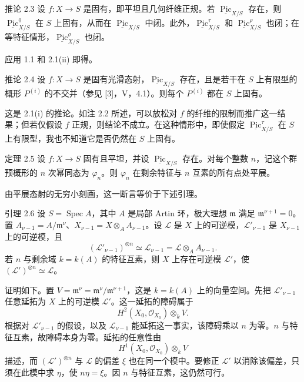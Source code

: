 \begin{statement}{推论 2.3}
设 $f\colon X\to S$ 是固有，即平坦且几何纤维正规。若 $\underline{\operatorname{Pic}}_{X/S}$ 存在，则 $\underline{\operatorname{Pic}}^0_{X/S}$ 在 $S$ 上固有，从而在 $\underline{\operatorname{Pic}}_{X/S}$ 中闭。此外，$\underline{\operatorname{Pic}}^\tau_{X/S}$ 和 $\underline{\operatorname{Pic}}^\rho_{X/S}$ 也闭；在等特征情形，$\underline{\operatorname{Pic}}^\sigma_{X/S}$ 也闭。
\end{statement}
应用 1.1 和 2.1(ii) 即得。

\begin{statement}{推论 2.4}
设 $f\colon X\to S$ 是固有光滑态射，$\underline{\operatorname{Pic}}_{X/S}$ 存在，且是若干在 $S$ 上有限型的概形 $P^{(i)}$ 的不交并（参见 [3]，V，4.1）。则每个 $P^{(i)}$ 都在 $S$ 上固有。
\end{statement}
这是 2.1(i) 的推论。如注 2.2 所述，可以放松对 $f$ 的纤维的限制而推广这一结果；但若仅假设 $f$ 正规，则结论不成立。在这种情形中，即使假定 $\underline{\operatorname{Pic}}^\tau_{X/S}$ 在 $S$ 上有限型，我也不知道它是否仍然在 $S$ 上固有。

\begin{statement}{定理 2.5}
设 $f\colon X\to S$ 固有且平坦，并设 $\underline{\operatorname{Pic}}_{X/S}$ 存在。对每个整数 $n$，记这个群预概形的 $n$ 次幂同态为 $\varphi_n$。则 $\varphi_n$ 在剩余特征与 $n$ 互素的所有点处平展。
\end{statement}
由平展态射的无穷小刻画，这一断言等价于下述引理。

\begin{statement}{引理 2.6}
设 $S=\operatorname{Spec}A$，其中 $A$ 是局部 Artin 环，极大理想 $\mathfrak m$ 满足 $\mathfrak m^{\nu+1}=0$。置 $A_{\nu-1}=A/\mathfrak m^\nu$、$X_{\nu-1}=X\otimes_AA_{\nu-1}$。设 $\mathcal L$ 是 $X$ 上的可逆模，$\mathcal L'_{\nu-1}$ 是 $X_{\nu-1}$ 上的可逆模，且
\[
 (\mathcal L'_{\nu-1})^{\otimes n}\simeq
 \mathcal L_{\nu-1}=\mathcal L\otimes_AA_{\nu-1}.
\]
若 $n$ 与剩余域 $k=k(A)$ 的特征互素，则 $X$ 上存在可逆模 $\mathcal L'$，使 $(\mathcal L')^{\otimes n}\simeq\mathcal L$。
\end{statement}

证明如下。置 $V=\mathfrak m^\nu=\mathfrak m^\nu/\mathfrak m^{\nu+1}$，这是 $k=k(A)$ 上的向量空间。先把 $\mathcal L'_{\nu-1}$ 任意延拓为 $X$ 上的可逆模 $\mathcal L'$。这一延拓的障碍属于
\[
 H^2(X_0,\mathcal O_{X_0})\otimes_kV.
\]
根据对 $\mathcal L'_{\nu-1}$ 的假设，以及 $\mathcal L_{\nu-1}$ 能延拓这一事实，该障碍乘以 $n$ 为零。$n$ 与特征互素，故障碍本身为零。延拓的任意性由
\[
 H^1(X_0,\mathcal O_{X_0})\otimes_kV
\]
描述，而 $(\mathcal L')^{\otimes n}$ 与 $\mathcal L$ 的偏差 $\xi$ 也在同一个模中。要修正 $\mathcal L'$ 以消除该偏差，只须在此模中求 $\eta$，使 $n\eta=\xi$。因 $n$ 与特征互素，这仍然可行。

